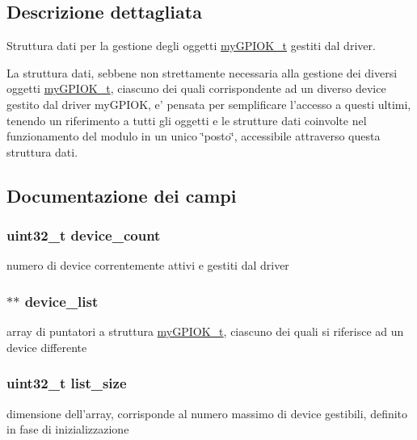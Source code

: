 \subsection{Descrizione dettagliata}
Struttura dati per la gestione degli oggetti \hyperlink{structmy_g_p_i_o_k__t}{my\+G\+P\+I\+O\+K\+\_\+t} gestiti dal driver. 

La struttura dati, sebbene non strettamente necessaria alla gestione dei diversi oggetti \hyperlink{structmy_g_p_i_o_k__t}{my\+G\+P\+I\+O\+K\+\_\+t}, ciascuno dei quali corrispondente ad un diverso device gestito dal driver my\+G\+P\+I\+O\+K, e' pensata per semplificare l'accesso a questi ultimi, tenendo un riferimento a tutti gli oggetti e le strutture dati coinvolte nel funzionamento del modulo in un unico \char`\"{}posto\char`\"{}, accessibile attraverso questa struttura dati. 

\subsection{Documentazione dei campi}
\hypertarget{structmy_g_p_i_o_k__list__t_a170d1d78f27f6ab4c8badaaa4b3f2305}{
\subsubsection[{device\+\_\+count}]{\setlength{\rightskip}{0pt plus 5cm}uint32\+\_\+t device\+\_\+count}}\label{structmy_g_p_i_o_k__list__t_a170d1d78f27f6ab4c8badaaa4b3f2305}
numero di device correntemente attivi e gestiti dal driver \hypertarget{structmy_g_p_i_o_k__list__t_a99b54fb4cab6e0b7ea3bd94415bbcca0}{
\subsubsection[{device\+\_\+list}]{$\ast$$\ast$ device\+\_\+list}}\label{structmy_g_p_i_o_k__list__t_a99b54fb4cab6e0b7ea3bd94415bbcca0}
array di puntatori a struttura \hyperlink{structmy_g_p_i_o_k__t}{my\+G\+P\+I\+O\+K\+\_\+t}, ciascuno dei quali si riferisce ad un device differente \hypertarget{structmy_g_p_i_o_k__list__t_aeff61809685e5df1b38aec1d871a49bb}{
\subsubsection[{list\+\_\+size}]{\setlength{\rightskip}{0pt plus 5cm}uint32\+\_\+t list\+\_\+size}}\label{structmy_g_p_i_o_k__list__t_aeff61809685e5df1b38aec1d871a49bb}
dimensione dell'array, corrisponde al numero massimo di device gestibili, definito in fase di inizializzazione 

